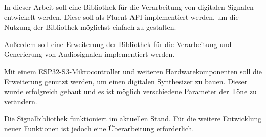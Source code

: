 In dieser Arbeit soll eine Bibliothek für die Verarbeitung von
digitalen Signalen entwickelt werden. Diese soll als Fluent API implementiert
werden, um die Nutzung der Bibliothek möglichst einfach zu gestalten.

Außerdem soll eine Erweiterung der Bibliothek für die Verarbeitung und
Generierung von Audiosignalen implementiert werden. 

Mit einem ESP32-S3-Mikrocontroller und weiteren Hardwarekomponenten soll die
Erweiterung genutzt werden, um einen digitalen Synthesizer zu bauen.
Dieser wurde erfolgreich gebaut und es ist möglich verschiedene Parameter
der Töne zu verändern. 

Die Signalbibliothek funktioniert im aktuellen Stand. Für die weitere
Entwicklung neuer Funktionen ist jedoch eine Überarbeitung erforderlich.